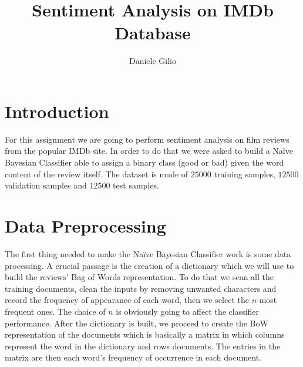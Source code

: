 \documentclass[10pt,a4paper]{report}
\author{Daniele Gilio}
\title{Sentiment Analysis on IMDb Database}
\begin{document}
\maketitle
\section{Introduction}
For this assignment we are going to perform sentiment analysis on film reviews from the popular IMDb site. In order to do that we were asked to build a Na\"{i}ve Bayesian Classifier able to assign a binary class (good or bad) given the word content of the review itself. The dataset is made of $25000$ training samples, $12500$ validation samples and $12500$ test samples.
\section{Data Preprocessing}
The first thing needed to make the Na\"{i}ve Bayesian Classifier work is some data processing. A crucial passage is the creation of a dictionary which we will use to build the reviews' Bag of Words representation. To do that we scan all the training documents, clean the inputs by removing unwanted characters and record the frequency of appearance of each word, then we select the $n$-most frequent ones. The choice of $n$ is obviously going to affect the classifier performance. After the dictionary is built, we proceed to create the BoW representation of the documents which is basically a matrix in which columns represent the word in the dictionary and rows documents. The entries in the matrix are then each word's frequency of occurrence in each document. 
\end{document}
